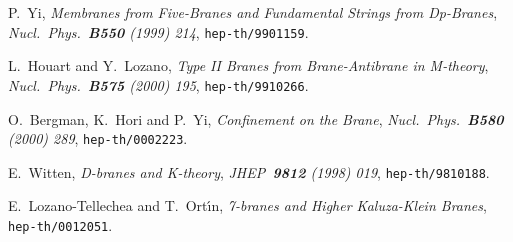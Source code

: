 \documentclass[12pt,a4paper]{article}
\begin{document}
\begin{thebibliography}{99}
P.~Yi, {\sl Membranes from Five-Branes and Fundamental Strings
from Dp-Branes}, {\it Nucl.~Phys.~{\bf B550} (1999) 214},
{\tt hep-th/9901159}.

L.~Houart and Y.~Lozano, {\sl Type II Branes from Brane-Antibrane
in M-theory}, {\it Nucl.~Phys.~{\bf B575} (2000) 195},
{\tt hep-th/9910266}.

O.~Bergman, K.~Hori and P.~Yi, {\sl Confinement on the Brane},
{\it Nucl.~Phys.~{\bf B580} (2000) 289},
{\tt hep-th/0002223}.

E.~Witten, {\sl D-branes and K-theory},
{\it JHEP~{\bf 9812} (1998) 019},
{\tt hep-th/9810188}.

E.~Lozano-Tellechea and T.~Ort\'{\i}n, {\sl 7-branes and Higher
Kaluza-Klein Branes}, {\tt hep-th/0012051}.


\end{thebibliography}
\end{document}
